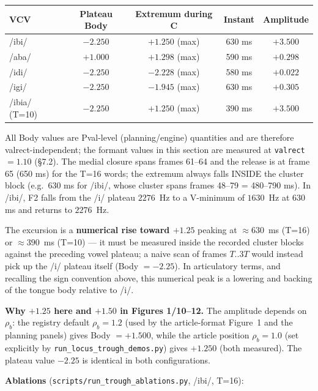 \documentclass[11pt,a4paper]{article}
\begin{document}
\begin{center}
\begin{tabular}{lcccc}
\toprule
VCV & Plateau Body & Extremum during C & Instant & Amplitude \\
\midrule
/ibi/ & $-2.250$ & $+1.250$ (max) & 630 ms & $+3.500$ \\
/aba/ & $+1.000$ & $+1.298$ (max) & 590 ms & $+0.298$ \\
/idi/ & $-2.250$ & $-2.228$ (max) & 580 ms & $+0.022$ \\
/igi/ & $-2.250$ & $-1.945$ (max) & 630 ms & $+0.305$ \\
/ibia/ (T=10) & $-2.250$ & $+1.250$ (max) & 390 ms & $+3.500$ \\
\bottomrule
\end{tabular}

\smallskip
All Body values are Pval-level (planning/engine) quantities and are
therefore valrect-independent; the formant values in this section are
measured at \texttt{valrect} $= 1.10$ (\S7.2). The medial closure
spans frames
61--64 and the release is at frame 65 (650 ms) for the T=16 words;
the extremum always falls INSIDE the cluster block (e.g.\ 630 ms for
/ibi/, whose cluster spans frames 48--79 = 480--790 ms). In /ibi/,
F2 falls from the /i/ plateau $2276$~Hz to a V-minimum of $1630$~Hz
at 630 ms and returns to $2276$~Hz.
\end{center}

The excursion is a \textbf{numerical rise toward $+1.25$} peaking at
$\approx 630$~ms (T=16) or $\approx 390$~ms (T=10) --- it must be
measured inside the recorded cluster blocks against the preceding
vowel plateau; a naive scan of frames $T..3T$ would instead pick up
the /i/ plateau itself (Body $= -2.25$). In articulatory terms, and
recalling the sign convention above, this numerical peak is a
lowering and backing of the tongue body relative to /i/.

\textbf{Why $+1.25$ here and $+1.50$ in Figures 1/10--12.} The
amplitude depends on $\rho_b$: the registry default $\rho_b = 1.2$
(used by the article-format Figure~1 and the planning panels) gives
Body $= +1.500$, while the article position $\rho_b = 1.0$ (set
explicitly by \texttt{run\_locus\_trough\_demos.py}) gives
$+1.250$ (both measured). The plateau value $-2.25$ is
identical in both configurations.

\textbf{Ablations} (\texttt{scripts/run\_trough\_ablations.py}, /ibi/, T=16):
\end{document}
